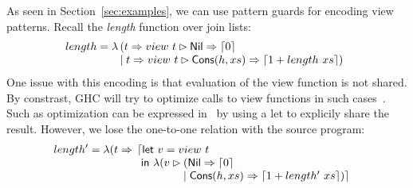 As seen in Section~\ref{sec:examples}, we can use pattern guards for
encoding view patterns. Recall 
the \textit{length} function over join lists:
\[
  length = \lambda \!\!\begin{array}[t]{l}
                     (t \Rightarrow view~t \rhd 
      \textsf{Nil} \Rightarrow \left\lceil 0\right\rceil \\
      \mid t \Rightarrow view~t \rhd \textsf{Cons}(h,xs) \Rightarrow \left\lceil 1+length~ xs\right\rceil)
    \end{array} 
\]
One issue with this encoding is that evaluation of the view function is not shared.
By constrast, GHC will try to optimize calls to view functions in
such cases~\cite{ghc_guide_view_patterns}.
Such as optimization can be expressed in \lambdaPMC\ by using a let to explicily share the result.
However, we lose the one-to-one relation with the source program:
\[
  length' = \lambda (t \Rightarrow\!\! \begin{array}[t]{l}
                                    \lceil \textsf{let}~ v = view~t \\
  ~\textsf{in}~ \lambda (v \rhd
  \!\!\!\begin{array}[t]{l}
    (\textsf{Nil} \Rightarrow \left\lceil 0\right\rceil  \\
    \mid \textsf{Cons}(h,xs) \Rightarrow \left\lceil 1+length'~ xs\right\rceil) \rceil
  \end{array}
                                  \end{array}
\]

    

